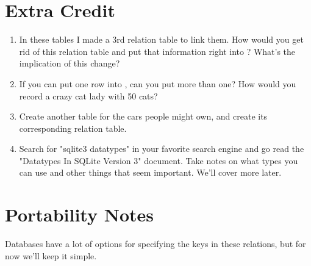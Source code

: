 \section{Extra Credit}

\begin{enumerate}
\item In these tables I made a 3rd relation table to link them.  How would you
    get rid of this relation table  and put that
    information right into ?  What's the implication of this
    change?
\item If you can put one row into , can you put more than
    one?  How would you record a crazy cat lady with 50 cats?
\item Create another table for the cars people might own, and create its
    corresponding relation table.
\item Search for "sqlite3 datatypes" in your favorite search engine and 
    go read the "Datatypes In SQLite Version 3" document.  Take notes on
    what types you can use and other things that seem important.  We'll
    cover more later.
\end{enumerate}

\section{Portability Notes}

Databases have a lot of options for specifying the keys in these relations,
but for now we'll keep it simple.

